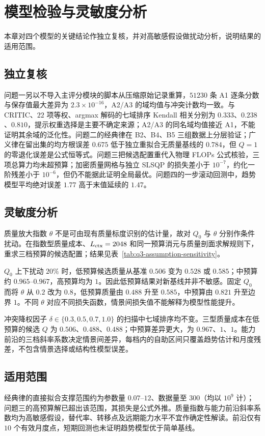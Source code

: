\section{模型检验与灵敏度分析}

本章对四个模型的关键结论作独立复核，并对高敏感假设做扰动分析，说明结果的适用范围。

\subsection{独立复核}
问题一另以不导入主评分模块的脚本从压缩原始记录重算，$51230$ 条 A1 逐条分数与保存值最大差异为 $2.3\times10^{-16}$，A2/A3 的域均值与冲突计数均一致。与 CRITIC、$22$ 项等权、argmax 解码的七域排序 Kendall 相关分别为 $0.333$、$0.238$、$0.810$，提示权重选择是主要不确定来源；A2/A3 的同名域均值接近 A1，不能证明其余域的泛化性。问题二的经典律在 B2、B4、B5 三组数据上分层验证；广义律在留出集的均方根误差 $0.675$ 低于独立重拟合无质量基线的 $0.784$，但 $Q=1$ 的零退化误差是公式恒等式。问题三把候选配置重代入物理 FLOPs 公式核验，三项总算力均未超预算；加密质量网格与独立 SLSQP 的损失差小于 $10^{-7}$，约化一阶残差小于 $10^{-6}$，但仍不能据此证明全局最优。问题四的一步滚动回测中，趋势模型平均绝对误差 $1.77$ 高于末值延续的 $1.47$。

\subsection{灵敏度分析}
质量放大指数 $\theta$ 不是可由现有质量标度识别的估计量，故对 $Q_0$ 与 $\theta$ 分别作条件扰动。在指数型质量成本、$L_{\mathrm{ctx}}=2048$ 和同一预算消元与质量剖面求解规则下，重求三档预算的候选配置；结果见表~\ref{tab:q3-assumption-sensitivity}。



$Q_0$ 上下扰动 $20\%$ 时，低预算候选质量从基准 $0.506$ 变为 $0.528$ 或 $0.585$；中预算约 $0.965$--$0.967$，高预算均为 $1$。因此低预算结果对新基线并非不敏感。固定 $Q_0$ 而将 $\theta$ 从 $0.2$ 改为 $0.8$，低预算质量由 $0.488$ 升至 $0.585$，中预算由 $0.821$ 升至边界 $1$。不同 $\theta$ 对应不同损失函数，情景间损失值不能解释为模型性能提升。

冲突降权因子 $\delta\in\{0.3,0.5,0.7,1.0\}$ 的扫描中七域排序均不变。三型质量成本在低预算的候选 $Q$ 为 $0.506$、$0.488$、$0.488$；中预算差异更大，为 $0.967$、$1$、$1$。能力前沿的三档斜率系数决定情景间差异，每档内的自助区间只覆盖趋势估计和月度残差，不包含情景选择或结构性模型误差。



\subsection{适用范围}
经典律的直接拟合支撑范围约为参数量 $0.07$--$12$、数据量至 $300$（均以 $10^9$ 计）；问题三的高预算解已超出该范围，其损失是公式外推。质量指数与能力前沿斜率系数均为高敏感假设，替代率、转移点及远期能力水平不宜作确定性解读。前沿仅有 $10$ 个有效月度点，短期回测也未证明趋势模型优于简单基线。
